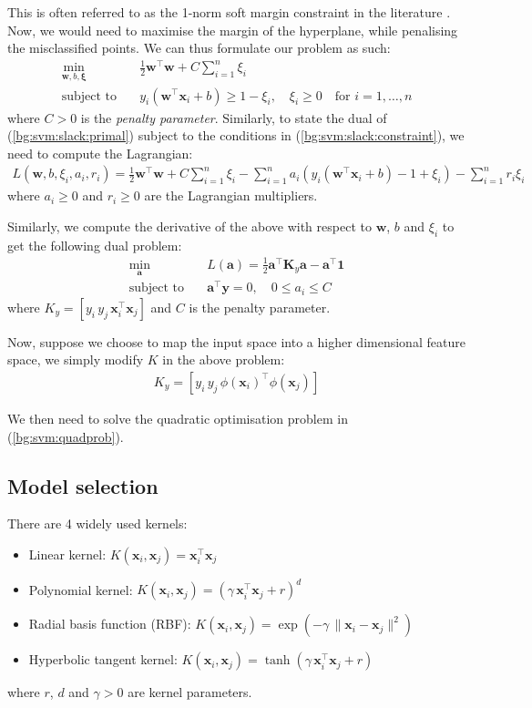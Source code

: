 \documentclass[12pt, twoside, a4paper]{report}
\def\vec{\boldsymbol}
\begin{document}
This is often referred to as the 1-norm soft margin constraint in the literature \cite{RefWorks:127}. Now, we would need to maximise the margin of the hyperplane, while penalising the misclassified points. We can thus formulate our problem as such:
\begin{align}
\min_{\vec{w}, b, \vec{\xi}} \quad &\frac{1}{2}\vec{w}^\top \vec{w} + C \sum_{i=1}^n \xi_i \label{bg:svm:slack:primal} \\
\text{subject to} \quad &y_i(\vec{w}^\top \vec{x}_i + b) \geq 1 - \xi_i , \quad 
\xi_i \geq 0 \quad \text{for $i = 1, \dots , n$}\label{bg:svm:slack:constraint}
\end{align}
where $C>0$ is the \textit{penalty parameter}. Similarly, to state the dual of (\ref{bg:svm:slack:primal}) subject to the conditions in (\ref{bg:svm:slack:constraint}), we need to compute the Lagrangian:
\begin{align*}
L(\vec{w}, b, \xi_i, a_i, r_i) =
\frac{1}{2} \vec{w}^\top \vec{w} + C \sum_{i=1}^n \xi_i - \sum_{i=1}^n a_i(y_i(\vec{w}^\top \vec{x}_i + b) - 1 + \xi_i) - \sum_{i=1}^n r_i\xi_i
\end{align*}
where $a_i \geq 0$ and $r_i \geq 0$ are the Lagrangian multipliers.

Similarly, we compute the derivative of the above with respect to $\vec{w}$, $b$ and $\xi_i$ to get the following dual problem:
\begin{align}
\min_{\vec{a}} \quad &L(\vec{a}) = \frac{1}{2}\vec{a}^\top \vec{K}_y \vec{a} - \vec{a}^\top \vec{1} \label{bg:svm:quadprob} \\
\text{subject to} \quad &\vec{a}^\top \vec{y} = 0, \quad 0 \leq a_i \leq C 
\end{align}
where $K_y = [y_i \, y_j \, \vec{x}_i^\top \vec{x}_j]$ and $C$ is the penalty parameter.

Now, suppose we choose to map the input space into a higher dimensional feature space, we simply modify $K$ in the above problem:
\begin{align*}
K_y = [y_i \, y_j \, \phi(\vec{x}_i)^\top \phi(\vec{x}_j)]
\end{align*}

We then need to solve the quadratic optimisation problem in (\ref{bg:svm:quadprob}).

\subsection{Model selection} \label{bg:ml:svm:model}
There are 4 widely used kernels:
\begin{itemize}
\item Linear kernel: $K(\vec{x}_i, \vec{x}_j) = \vec{x}_i^\top \vec{x}_j$
\item Polynomial kernel: $K(\vec{x}_i, \vec{x}_j) = (\gamma \, \vec{x}_i^\top \vec{x}_j + r)^d$
\item Radial basis function (RBF): $K(\vec{x}_i, \vec{x}_j) = \exp(-\gamma \, \| \vec{x}_i - \vec{x}_j \|^2)$
\item Hyperbolic tangent kernel: $K(\vec{x}_i, \vec{x}_j) = \tanh(\gamma \, \vec{x}_i^\top \vec{x}_j + r)$
\end{itemize}
where $r$, $d$ and $\gamma>0$ are kernel parameters.
\end{document}

